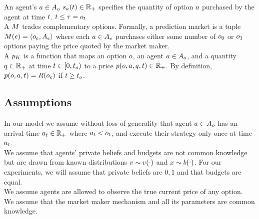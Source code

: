 An agent's $a\in A_o$  
$s_a(t) \in \mathbb{R}_+$ specifies the quantity of option 
$o$ purchased by the agent at time $t$. $t \leq \tau = o_t$\\

A  $M$ trades complementary options. 
Formally, a prediction market is a tuple $M(e) = 
\left<o_e, A_e \right>$ where each  
$a\in A_e$ purchases 
either some number of $o_0$ or $o_1$ options paying the price quoted by the 
market maker.\\

A  $p_K$ is a function 
that maps an option $o$, an agent $a \in A_o$, 
and a quantity $q\in\mathbb{R}_+$ at time $t \in [0,t_o)$ 
to a price $p(o,a,q,t) \in \mathbb{R}_+$. 
By definition, $p(o,a, t) = R(o_e)$ if 
$t \ge t_o$.\\


\subsection{Assumptions}

In our model we assume without loss of generality that agent $a \in A_o$ has an arrival time 
$a_t \in \mathbb{R}_+$ where $a_t < o_t$, 
and execute their strategy only once at time $a_t$.\\

We assume that agents' private beliefs and budgets are not common knowledge
but are drawn from known distributions $v \sim v(\cdot)$ and
$x \sim b(\cdot)$. For our experiments, we will assume that private beliefs are ${0,1}$ and that budgets are equal.\\

We assume agents are allowed to observe the true current price of any option.\\

We assume that the market maker mechanism and all its parameters are common knowledge.\\
